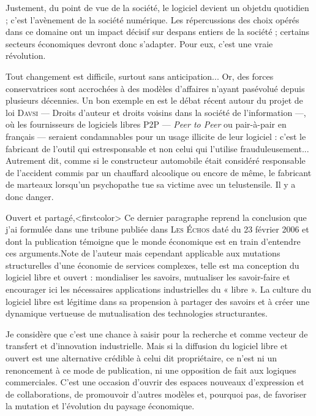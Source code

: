 Justement, du point de vue de la société, le logiciel devient un objet\linebreak du quotidien ; c'est l'avènement de la société numérique. Les répercus\-sions des choix opérés dans ce domaine ont un impact décisif sur des\linebreak pans entiers de la société ; certains secteurs économiques devront donc s'adapter. Pour eux, c'est une vraie révolution.

Tout changement est difficile, surtout sans anticipation... Or, des for\-ces conservatrices sont accrochées à des modèles d'affaires n'ayant pas\linebreak évolué depuis plusieurs décennies. Un bon exemple en est le débat ré\-cent autour du projet de loi \textsc{Davsi} --- Droits d'auteur et droits voisins dans la société de l'information ---, où les fournisseurs de logiciels libres P2P --- \textit{Peer to Peer} ou pair-à-pair en français --- seraient condamnables pour un usage illicite de leur logiciel : c'est le fabricant de l'outil qui est\linebreak responsable et non celui qui l'utilise frauduleusement... Autrement dit, comme si le constructeur automobile était considéré responsable de l'accident commis par un chauffard alcoolique ou encore de même, le fabricant de marteaux lorsqu'un psychopathe tue sa victime avec un tel\linebreak ustensile. Il y a donc danger.

Ouvert et partagé,\caution[t]<firstcolor>{%
Ce dernier paragraphe reprend la con\-clusion que j’ai formulée dans une tribune publiée dans \textsc{Les Échos} daté du 23 février 2006 et dont la publication témoigne que le monde économique est en train d’entendre ces arguments.}{Note de l'auteur}
mais cependant applicable aux mutations structurelles d’une économie de services complexes, telle est ma conception du logiciel libre et ouvert : mondialiser les savoirs, mutualiser les savoir-faire et encourager ici les nécessaires applications industrielles du « libre ». La culture du logiciel libre est légitime dans sa propension à partager des savoirs et à créer une dynamique vertueuse de mutualisation des technologies structurantes. 

Je considère que c’est une chance à saisir pour la recherche et com\-me vecteur de transfert et d’innovation industrielle. Mais si la diffusion du logiciel libre et ouvert est une alternative crédible à celui dit propriétaire, ce n’est ni un renoncement à ce mode de publication, ni une opposition de fait aux logiques commerciales. C’est une occasion d’ouvrir des espaces nouveaux d’expression et de collaborations, de promouvoir d’autres modèles et, pourquoi pas, de favoriser la mutation et l’évolution du paysage économique. 

